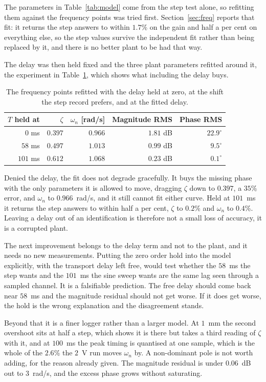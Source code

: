 The parameters in Table~\ref{tab:model} come from the step test alone, so refitting them
against the frequency points was tried first. Section~\ref{sec:freq} reports that fit: it
returns the step answers to within $1.7$\% on the gain and half a per cent on everything
else, so the step values survive the independent fit rather than being replaced by it, and
there is no better plant to be had that way.

The delay was then held fixed and the three plant parameters refitted around it, the
experiment in Table~\ref{tab:refit}, which shows what including the delay buys.

\begin{table}[h!]
\centering
\begin{tabular}{rrrrr}
\toprule
\textbf{$T$ held at} & \textbf{$\zeta$} & \textbf{$\omega_n$ [rad/s]} &
\textbf{Magnitude RMS} & \textbf{Phase RMS} \\
\midrule
$0$ ms   & $0.397$ & $0.966$ & $1.81$ dB & $22.9^\circ$ \\
$58$ ms  & $0.497$ & $1.013$ & $0.99$ dB & $9.5^\circ$ \\
$101$ ms & $0.612$ & $1.068$ & $0.23$ dB & $0.1^\circ$ \\
\bottomrule
\end{tabular}
\caption{The frequency points refitted with the delay held at zero, at the shift the step record prefers, and at the fitted delay.}
\label{tab:refit}
\end{table}

Denied the delay, the fit does not degrade gracefully. It buys the missing phase with the only
parameters it is allowed to move, dragging $\zeta$ down to $0.397$, a $35$\% error, and
$\omega_n$ to $0.966$~rad/s, and it still cannot fit either curve. Held at $101$~ms it returns
the step answers to within half a per cent, $\zeta$ to $0.2$\% and $\omega_n$ to $0.4$\%.
Leaving a delay out of an identification is therefore not a small loss of accuracy, it is a
corrupted plant.

The next improvement belongs to the delay term and not to the plant, and it needs no new
measurements. Putting the zero order hold into the model explicitly, with the transport delay
left free, would test whether the $58$~ms the step wants and the $101$~ms the sine sweep wants
are the same lag seen through a sampled channel. It is a falsifiable prediction. The free delay
should come back near $58$~ms and the magnitude residual should not get worse. If it does get
worse, the hold is the wrong explanation and the disagreement stands.

Beyond that it is a finer logger rather than a larger model. At $1$~mm the second overshoot
sits at half a step, which shows it is there but takes a third reading of $\zeta$ with it, and at $100$~ms the peak
timing is quantised at one sample, which is the whole of the $2.6$\% the $2$~V run moves
$\omega_n$ by. A non-dominant pole is not worth adding, for the reason already given. The
magnitude residual is under $0.06$~dB out to $3$~rad/s, and the excess phase grows without
saturating.
